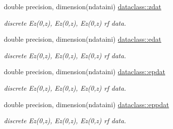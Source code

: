 \textbf{ }\par
\begin{DoxyCompactItemize}
\item 
double precision, dimension(ndataini) \mbox{\hyperlink{namespacedataclass_aeed47a37719b1f84d885a1cb8a962081}{dataclass\+::zdat}}
\begin{DoxyCompactList}\small\item\em discrete Ez(0,z), Ez\textquotesingle{}(0,z), Ez\textquotesingle{}\textquotesingle{}(0,z) rf data. \end{DoxyCompactList}\item 
double precision, dimension(ndataini) \mbox{\hyperlink{namespacedataclass_a67357b933079ed021a94705c576fead0}{dataclass\+::edat}}
\begin{DoxyCompactList}\small\item\em discrete Ez(0,z), Ez\textquotesingle{}(0,z), Ez\textquotesingle{}\textquotesingle{}(0,z) rf data. \end{DoxyCompactList}\item 
double precision, dimension(ndataini) \mbox{\hyperlink{namespacedataclass_a2f77b697b14f3e0d557f044ea69402d8}{dataclass\+::epdat}}
\begin{DoxyCompactList}\small\item\em discrete Ez(0,z), Ez\textquotesingle{}(0,z), Ez\textquotesingle{}\textquotesingle{}(0,z) rf data. \end{DoxyCompactList}\item 
double precision, dimension(ndataini) \mbox{\hyperlink{namespacedataclass_a1c9d30100962693c922470368987ec8a}{dataclass\+::eppdat}}
\begin{DoxyCompactList}\small\item\em discrete Ez(0,z), Ez\textquotesingle{}(0,z), Ez\textquotesingle{}\textquotesingle{}(0,z) rf data. \end{DoxyCompactList}\end{DoxyCompactItemize}

